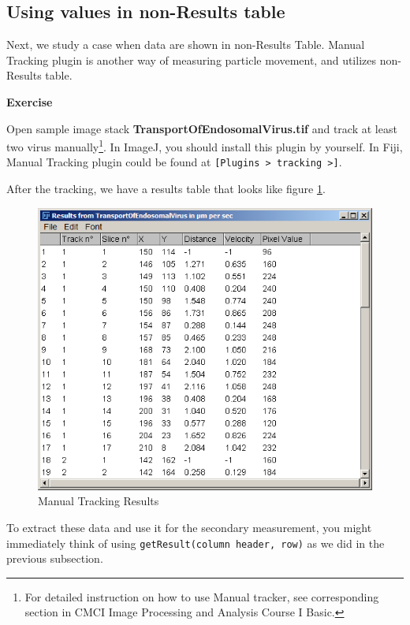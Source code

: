 \documentclass[11pt,a4paper,oneside]{report}
\newenvironment{indentexercise}[1]%
{{\setlength{\leftmargin}{2em}}%
\textbf{Exercise \thesubsection-#1}%
\begin{list}{}%
	\item%
}
{\end{list}}
\newcommand{\ijmenu}[1]{\texttt{\small#1}}
\newcommand{\ilcom}[1]{\texttt{\small#1}}
\begin{document}
\subsection{Using values in non-Results table}
Next, we study a case when data are shown in non-Results Table. Manual Tracking plugin is another way of measuring particle movement, and utilizes non-Results table. 

\begin{indentexercise}{1}
Open sample image stack \textbf{TransportOfEndosomalVirus.tif} and track at least two virus manually\footnote{ For detailed instruction on how to use Manual tracker, see corresponding section in CMCI Image Processing and Analysis Course I Basic.}. In ImageJ, you should install this plugin by yourself. In Fiji, Manual Tracking plugin could be found at \ijmenu{[Plugins > tracking >]}.
\end{indentexercise}

After the tracking, we have a results table that looks like figure \ref{fig:manualtrackingresults}.
\begin{figure}[htbp]
\begin{center}
\includegraphics[scale=0.6]{fig/fig253_ManualTrackerResultsWindow.png}
\caption{Manual Tracking Results}
\label{fig:manualtrackingresults}
\end{center}
\end{figure}

To extract these data and use it for the secondary measurement, you might immediately think of using \ilcom{getResult(column header, row)} as we did in the previous subsection.
\end{document}
